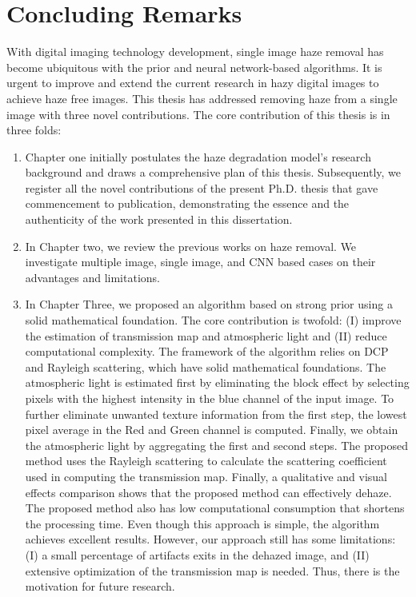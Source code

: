 \documentclass[doctor,english,listoffigures,listoftables]{thesis-uestc}
\begin{document}
\section{Concluding Remarks}
With digital imaging technology development, single image haze removal has become ubiquitous with the prior and neural network-based algorithms. It is urgent to improve and extend the current research in hazy digital images to achieve haze free images. This thesis has addressed removing haze from a single image with three novel contributions. The core contribution of this thesis is in three folds:
\begin{enumerate}
   \item Chapter one initially postulates the haze degradation model's research background and draws a comprehensive plan of this thesis. Subsequently, we register all the novel contributions of the present Ph.D. thesis that gave commencement to publication, demonstrating the essence and the authenticity of the work presented in this dissertation. 
   \item In Chapter two, we review the previous works on haze removal. We investigate multiple image, single image, and CNN based cases on their advantages and limitations. 
 
    \item  In Chapter Three, we proposed an algorithm based on strong prior using a solid mathematical foundation. The core contribution is twofold: (I) improve the estimation of transmission map and atmospheric light and (II) reduce computational complexity. The framework of the algorithm relies on DCP and Rayleigh scattering, which have solid mathematical foundations. The atmospheric light is estimated first by eliminating the block effect by selecting pixels with the highest intensity in the blue channel of the input image. To further eliminate unwanted texture information from the first step, the lowest pixel average in the Red and Green channel is computed. Finally, we obtain the atmospheric light by aggregating the first and second steps. The proposed method uses the Rayleigh scattering to calculate the scattering coefficient used in computing the transmission map.  Finally, a qualitative and visual effects comparison shows that the proposed method can effectively dehaze. The proposed method also has low computational consumption that shortens the processing time. Even though this approach is simple, the algorithm achieves excellent results. However, our approach still has some limitations: (I) a small percentage of artifacts exits in the dehazed image, and (II) extensive optimization of the transmission map is needed. Thus, there is the motivation for future research.
    

\end{enumerate}
\end{document}

